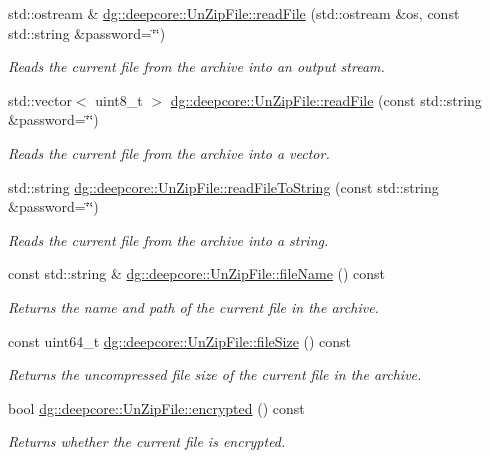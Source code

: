 \begin{DoxyCompactItemize}
std\+::ostream \& \hyperlink{group___utility_module_ga2139dc65cb701db211a8fe4970232307}{dg\+::deepcore\+::\+Un\+Zip\+File\+::read\+File} (std\+::ostream \&os, const std\+::string \&password=\char`\"{}\char`\"{})
\begin{DoxyCompactList}\small\item\em Reads the current file from the archive into an output stream. \end{DoxyCompactList}\item 
std\+::vector$<$ uint8\+\_\+t $>$ \hyperlink{group___utility_module_gaf6c3c8e93c73b827d8dcd06c7b0aa1f8}{dg\+::deepcore\+::\+Un\+Zip\+File\+::read\+File} (const std\+::string \&password=\char`\"{}\char`\"{})
\begin{DoxyCompactList}\small\item\em Reads the current file from the archive into a vector. \end{DoxyCompactList}\item 
std\+::string \hyperlink{group___utility_module_gaff912e76c9566cf07f198acc2df1decc}{dg\+::deepcore\+::\+Un\+Zip\+File\+::read\+File\+To\+String} (const std\+::string \&password=\char`\"{}\char`\"{})
\begin{DoxyCompactList}\small\item\em Reads the current file from the archive into a string. \end{DoxyCompactList}\item 
const std\+::string \& \hyperlink{group___utility_module_ga4c5433ff98fc88ebe244871a16660e0f}{dg\+::deepcore\+::\+Un\+Zip\+File\+::file\+Name} () const 
\begin{DoxyCompactList}\small\item\em Returns the name and path of the current file in the archive. \end{DoxyCompactList}\item 
const uint64\+\_\+t \hyperlink{group___utility_module_ga447144b52bd10fb30c362d8b05f9547a}{dg\+::deepcore\+::\+Un\+Zip\+File\+::file\+Size} () const 
\begin{DoxyCompactList}\small\item\em Returns the uncompressed file size of the current file in the archive. \end{DoxyCompactList}\item 
bool \hyperlink{group___utility_module_gafd884d3fc036bfe37ec3e4e4c272d466}{dg\+::deepcore\+::\+Un\+Zip\+File\+::encrypted} () const 
\begin{DoxyCompactList}\small\item\em Returns whether the current file is encrypted. \end{DoxyCompactList}\item 

\end{DoxyCompactItemize}
